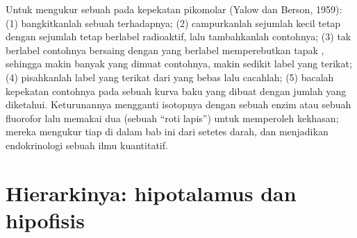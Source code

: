 \begin{method}[Radioimunouji]\label{met:b3:endocrinology:ria}
Untuk mengukur sebuah  pada kepekatan pikomolar (Yalow dan Berson,
1959): (1) bangkitkanlah sebuah  terhadapnya; (2) campurkanlah sejumlah kecil tetap
 dengan sejumlah tetap  berlabel radioaktif,
lalu tambahkanlah contohnya; (3)  tak berlabel contohnya bersaing
dengan yang berlabel memperebutkan tapak , sehingga makin banyak  yang
dimuat contohnya, makin sedikit label yang terikat; (4) pisahkanlah label yang terikat dari yang
bebas lalu cacahlah; (5) bacalah kepekatan contohnya pada sebuah kurva
baku yang dibuat dengan jumlah yang diketahui. Keturunannya mengganti isotopnya
dengan sebuah enzim atau sebuah fluorofor lalu memakai dua  (sebuah ``roti lapis'')
untuk memperoleh kekhasan; mereka mengukur tiap  di dalam bab ini dari
setetes darah, dan menjadikan endokrinologi sebuah ilmu kuantitatif.
\end{method}

\section{Hierarkinya: hipotalamus dan hipofisis}

